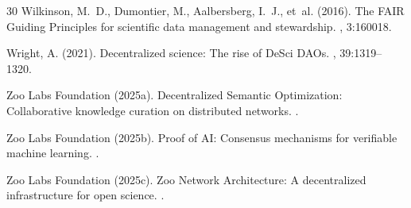 \documentclass[11pt,a4paper]{article}
\begin{document}
\begin{thebibliography}{30}
Wilkinson, M.~D., Dumontier, M., Aalbersberg, I.~J., et~al. (2016).
\newblock The FAIR Guiding Principles for scientific data management and stewardship.
, 3:160018.

Wright, A. (2021).
\newblock Decentralized science: The rise of DeSci DAOs.
, 39:1319--1320.

Zoo Labs Foundation (2025a).
\newblock Decentralized Semantic Optimization: Collaborative knowledge curation on distributed networks.
.

Zoo Labs Foundation (2025b).
\newblock Proof of AI: Consensus mechanisms for verifiable machine learning.
.

Zoo Labs Foundation (2025c).
\newblock Zoo Network Architecture: A decentralized infrastructure for open science.
.

\end{thebibliography}
\end{document}
